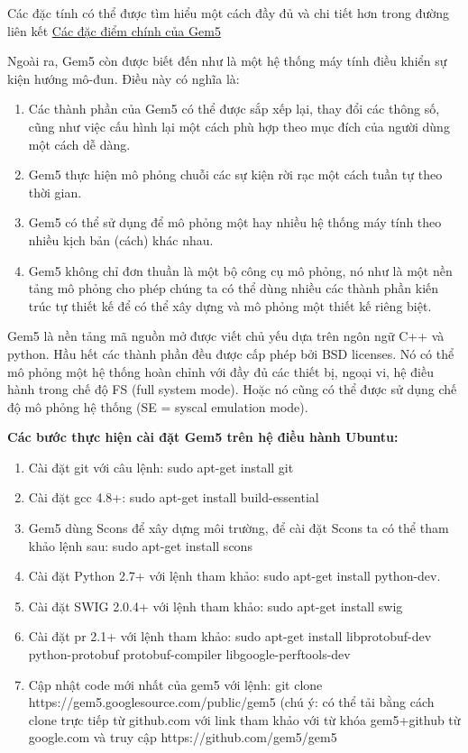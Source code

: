 \documentclass{article}
\begin{document}
Các đặc tính có thể được tìm hiểu một cách đầy đủ và chi tiết hơn trong đường liên kết \href{http://gem5.org/Main_Page}{Các đặc điểm chính của Gem5}

Ngoài ra, Gem5 còn được biết đến như là một hệ thống máy tính điều khiển sự kiện hướng mô-đun. Điều này có nghĩa là:

\begin{enumerate}
	\item Các thành phần của Gem5 có thể được sắp xếp lại, thay đổi các thông số, cũng như việc cấu hình lại một cách phù hợp theo mục đích của người dùng một cách dễ dàng.
	\item Gem5 thực hiện mô phỏng chuỗi các sự kiện rời rạc một cách tuần tự theo thời gian.
	\item Gem5 có thể sử dụng để mô phỏng một hay nhiều hệ thống máy tính theo nhiều kịch bản (cách) khác nhau.
	\item Gem5 không chỉ đơn thuần là một bộ công cụ mô phỏng, nó như là một nền tảng mô phỏng cho phép chúng ta có thể dùng nhiều các thành phần kiến trúc tự thiết kế để có thể xây dựng và mô phỏng một thiết kế riêng biệt. 
\end{enumerate}

Gem5 là nền tảng mã nguồn mở được viết chủ yếu dựa trên ngôn ngữ C++ và python. Hầu hết các thành phần đều được cấp phép bởi BSD licenses. Nó có thể mô phỏng một hệ thống hoàn chỉnh với đầy đủ các thiết bị, ngoại vi, hệ điều hành trong chế độ FS (full system mode). Hoặc nó cũng có thể được sử dụng chế độ mô phỏng hệ thống (SE = syscal emulation mode).

\textbf{Các bước thực hiện cài đặt Gem5 trên hệ điều hành Ubuntu:}
\begin{enumerate}
	\item Cài đặt git với câu lệnh: sudo apt-get install git
	\item Cài đặt gcc 4.8+: sudo apt-get install build-essential
	\item Gem5 dùng Scons để xây dựng môi trường, để cài đặt Scons ta có thể tham khảo lệnh sau: sudo apt-get install scons
	\item Cài đặt Python 2.7+ với lệnh tham khảo: sudo apt-get install python-dev.
	\item Cài đặt SWIG 2.0.4+ với lệnh tham khảo: sudo apt-get install swig
	\item Cài đặt pr 2.1+ với lệnh tham khảo: sudo apt-get install libprotobuf-dev python-protobuf protobuf-compiler libgoogle-perftools-dev
	\item Cập nhật code mới nhất của gem5 với lệnh: git clone https://gem5.googlesource.com/public/gem5 (chú ý: có thể tải bằng cách clone trực tiếp từ github.com với link tham khảo với từ khóa gem5+github từ google.com và truy cập https://github.com/gem5/gem5
\end{enumerate}
\end{document}
